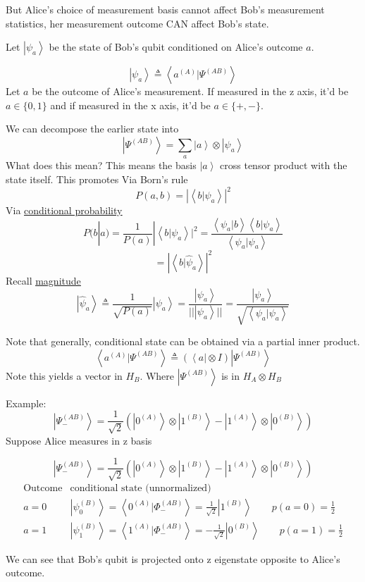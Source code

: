 \documentclass[
]{article}
\let\oldhyperref\hyperref
\renewcommand{\hyperref}[2][]{\oldhyperref[#1]{\underline{#2}}}
\providecommand{\ket}[1]{\left\lvert #1 \right\rangle}
\providecommand{\bra}[1]{\left\langle #1 \right\rvert}
\providecommand{\braket}[1]{\left\langle #1 \right\rangle}
\begin{document}
But Alice's choice of measurement basis cannot affect Bob's measurement statistics, her measurement outcome CAN affect Bob's state.

Let $\ket{\psi_a}$ be the state of Bob's qubit conditioned on Alice's outcome $a$.


\[
	\ket{\psi_a} \triangleq \braket{a^{(A)}|\Psi^{(AB)}}
\]
Let $a$ be the outcome of Alice's measurement. If measured in the z axis, it'd be $a\in\{0,1\}$ and if measured in the x axis, it'd be $a\in\{+,-\}$.

We can decompose the earlier state into
\[
	\ket{\Psi^{(AB)}}=\sum_a\ket{a}\otimes \ket{\psi_a}
\]
What does this mean? This means the basis $\ket{a}$ cross tensor product with the state itself. This promotes
Via Born's rule
\[
	P(a,b)=|\braket{b|\psi_a}|^2
\]
Via \hyperref[conditional-probability]{conditional probability}
\[
	P(b|a)=\frac{1}{P(a)}|\braket{b|\psi_a}|^2=\frac{\braket{\psi_a|b}\braket{b|\psi_a}}{\braket{\psi_a|\psi_a}}
\]
\[
	=|\braket{b|\hat{\psi}_a}|^2
\]
Recall \hyperref[magnitude]{magnitude}
\[
	\ket{\hat{\psi}_a}\triangleq\frac{1}{\sqrt{P(a)}}\ket{\psi_a}=\frac{\ket{\psi_a}}{||\ket{\psi_a}||}=\frac{\ket{\psi_a}}{\sqrt{\braket{\psi_a|\psi_a}}}
\]

Note that generally, conditional state can be obtained via a partial inner product.
\[
	\boxed{\braket{a^{(A)}|\Psi^{(AB)}}\triangleq(\bra{a}\otimes I)\ket{\Psi^{(AB)}}}
\]
Note this yields a vector in $H_B$.
Where $\ket{\Psi^{(AB)}}$ is in $H_A \otimes H_B$

Example:
\[
	\ket{\Psi^{(AB)}_-}=\frac{1}{\sqrt{2}}\left(\ket{{0}^{(A)}}\otimes \ket{1^{(B)}}-\ket{1^{(A)}}\otimes \ket{{0}^{(B)}}\right)
\]
Suppose Alice measures in z basis

\[
	\ket{\Psi^{(AB)}_-}=\frac{1}{\sqrt{2}}\left(\ket{{0}^{(A)}}\otimes \ket{1^{(B)}}-\ket{1^{(A)}}\otimes \ket{{0}^{(B)}}\right)
\]
\[
	\begin{array}{c|c}
		\text{Outcome} & \text{conditional state (unnormalized)}                                                                                  \\
		\hline
		a = 0          & \ket{\psi_0^{(B)}} = \braket{{0}^{(A)} | \Phi_-^{(AB)}} = \frac{1}{\sqrt{2}} \ket{1^{(B)}} \qquad p(a=0) = \tfrac{1}{2}  \\[1em]
		a = 1          & \ket{\psi_1^{(B)}} = \braket{1^{(A)} | \Phi_-^{(AB)}} = -\frac{1}{\sqrt{2}} \ket{{0}^{(B)}} \qquad p(a=1) = \tfrac{1}{2}
	\end{array}
\]

We can see that Bob's qubit is projected onto z eigenstate opposite to Alice's outcome.
\end{document}
